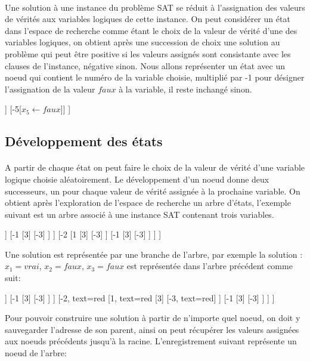 \paragraph{}
Une solution à une instance du problème SAT se réduit à l’assignation des valeurs de vérités aux variables logiques de cette instance. On peut considérer un état dans l’espace de recherche comme étant le choix de la valeur de vérité d’une des variables logiques, on obtient après une succession de choix une solution au problème qui peut être positive si les valeurs assignés sont consistante avec les clauses de l’instance, négative sinon. Nous allons représenter un état avec un noeud qui contient le numéro de la variable choisie, multiplié par -1 pour désigner l’assignation de la valeur $faux$ à la variable, il reste inchangé sinon.\\
\begin{center}
	\begin{forest} [
		[5[$x_{5} \leftarrow vrai$]]
		[-5[$x_{5} \leftarrow faux$]]
		]
	\end{forest}
\end{center}
\newpage
\subsection{Développement des états}
\paragraph{}
A partir de chaque état on peut faire le choix de la valeur de vérité d’une variable logique choisie aléatoirement. Le développement d’un noeud donne deux successeurs, un pour chaque valeur de vérité assignée à la prochaine variable. On obtient après l’exploration de l’espace de recherche un arbre d’états, l’exemple suivant est un arbre associé à une instance SAT contenant trois variables.\\
\begin{center}
	\begin{forest} [
		[2
			[1
				[3]
				[-3]
			]
			[-1
				[3]
				[-3]
			]
		]
		[-2
			[1
				[3]
				[-3]
			]
			[-1
				[3]
				[-3]
			]
		]
		]
	\end{forest}
\end{center}
Une solution est représentée par une branche de l’arbre, par exemple la solution : $x_{1} = vrai$, $x_{2} = faux$, $x_{3} = faux$ est représentée dans l’arbre précédent comme suit:
\begin{center}
	\begin{forest} [
		[2
		[1
		[3]
		[-3]
		]
		[-1
		[3]
		[-3]
		]
		]
		[-2, text=red
		[1, text=red
		[3]
		[-3, text=red]
		]
		[-1
		[3]
		[-3]
		]
		]
		]
	\end{forest}
\end{center}
Pour pouvoir construire une solution à partir de n’importe quel noeud, on doit y sauvegarder l’adresse de son parent, ainsi on peut récupérer les valeurs assignées aux noeuds précédents jusqu’à la racine. L’enregistrement suivant représente un noeud de l’arbre:

